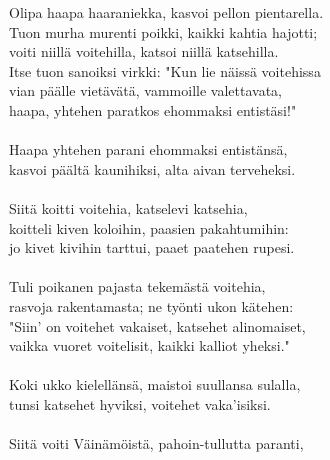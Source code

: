 Olipa haapa haaraniekka, kasvoi pellon pientarella.                    \\
Tuon murha murenti poikki, kaikki kahtia hajotti;                      \\
voiti niillä voitehilla, katsoi niillä katsehilla.                     \\
Itse tuon sanoiksi virkki: "Kun lie näissä voitehissa                  \\
vian päälle vietävätä, vammoille valettavata,                          \\
haapa, yhtehen paratkos ehommaksi entistäsi!"                          \\
                                                                       \\
Haapa yhtehen parani ehommaksi entistänsä,                             \\
kasvoi päältä kaunihiksi, alta aivan terveheksi.                       \\
                                                                       \\
Siitä koitti voitehia, katselevi katsehia,                             \\
koitteli kiven koloihin, paasien pakahtumihin:                         \\
jo kivet kivihin tarttui, paaet paatehen rupesi.                       \\
                                                                       \\
Tuli poikanen pajasta tekemästä voitehia,                              \\
rasvoja rakentamasta; ne työnti ukon kätehen:                          \\
"Siin' on voitehet vakaiset, katsehet alinomaiset,                     \\
vaikka vuoret voitelisit, kaikki kalliot yheksi."                      \\
                                                                       \\
Koki ukko kielellänsä, maistoi suullansa sulalla,                      \\
tunsi katsehet hyviksi, voitehet vaka'isiksi.                          \\
                                                                       \\
Siitä voiti Väinämöistä, pahoin-tullutta paranti,                      \\
